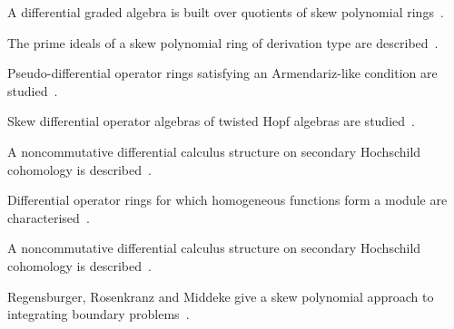 A differential graded algebra is built over quotients of skew polynomial rings~\cite{WlDifferentialGradedAlgebraOverQ2020}.

The prime ideals of a skew polynomial ring of derivation type are described~\cite{WlPrimeIdealsInSkewPolynomialRin2020}.

Pseudo-differential operator rings satisfying an Armendariz-like condition are studied~\cite{WlPseudoDifferentialOperatorRing2020}.

Skew differential operator algebras of twisted Hopf algebras are studied~\cite{WlSkewDifferentialOperatorAlgebr2020}.

A noncommutative differential calculus structure on secondary Hochschild cohomology is described~\cite{WlNoncommutativeDifferentialCalc2020}.

Differential operator rings for which homogeneous functions form a module are characterised~\cite{WlDifferentialOperatorRingsForWh2020}.

A noncommutative differential calculus structure on secondary Hochschild cohomology is described~\cite{WlNoncommutativeDifferentialCalc2020}.

Regensburger, Rosenkranz and Middeke give a skew polynomial approach to integrating boundary problems~\cite{WlGRegensburgerMRosenkranzJMidde2020}.
